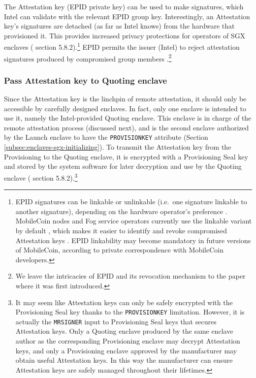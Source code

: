 The Attestation key (EPID private key) can be used to make signatures, which Intel can validate with the relevant EPID group key. Interestingly, an Attestation key's signatures are detached (as far as Intel knows) from the hardware that provisioned it. This provides increased privacy protections for operators of SGX enclaves (\cite{intel-sgx-explained-advanced} section 5.8.2).\footnote{EPID signatures can be linkable or unlinkable (i.e.\ one signature linkable to another signature), depending on the hardware operator's preference \cite{sgx-epid-provisioning-attestation, kudelski-sgx-secure-enclaves-review}. MobileCoin nodes and Fog service operators currently use the linkable variant by default \cite{mobilecoin-consensus-service-readme}, which makes it easier to identify and revoke compromised Attestation keys \cite{sgx-epid-provisioning-attestation}. EPID linkability may become mandatory in future versions of MobileCoin, according to private correspondence with MobileCoin developers.} EPID permits the issuer (Intel) to reject attestation signatures produced by compromised group members \cite{epid-paper, sgx-epid-provisioning-attestation}.\footnote{We leave the intricacies of EPID and its revocation mechanism to the paper \cite{epid-paper} where it was first introduced.}

\subsubsection{Pass Attestation key to Quoting enclave}

Since the Attestation key is the linchpin of remote attestation, it should only be accessible by carefully designed enclaves. In fact, only one enclave is intended to use it, namely the Intel-provided Quoting enclave. This enclave is in charge of the remote attestation process (discussed next), and is the second enclave authorized by the Launch enclave to have the {\tt PROVISIONKEY} attribute (Section \ref{subsec:enclaves-sgx-initializing}). To transmit the Attestation key from the Provisioning to the Quoting enclave, it is encrypted with a Provisioning Seal key and stored by the system software for later decryption and use by the Quoting enclave (\cite{intel-sgx-explained-advanced} section 5.8.2).\footnote{It may seem like Attestation keys can only be safely encrypted with the Provisioning Seal key thanks to the {\tt PROVISIONKEY} limitation. However, it is actually the {\tt MRSIGNER} input to Provisioning Seal keys that secures Attestation keys. Only a Quoting enclave produced by the same enclave author as the corresponding Provisioning enclave may decrypt Attestation keys, and only a Provisioning enclave approved by the manufacturer may obtain useful Attestation keys. In this way the manufacturer can ensure Attestation keys are safely managed throughout their lifetimes.}


